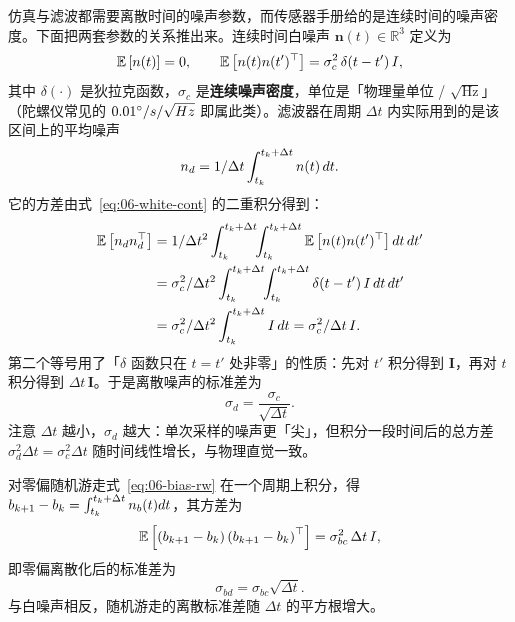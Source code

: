 仿真与滤波都需要离散时间的噪声参数，而传感器手册给的是连续时间的噪声密度。下面把两套参数的关系推出来。连续时间白噪声 $\bm{n}(t)\in\mathbb{R}^{3}$ 定义为
\begin{equation}
  \mathbb{E}\left[n(t)\right]=0,
  \qquad
  \mathbb{E}\left[n(t)n(t')^{\top}\right]=\sigma_c^{2}\,\delta(t-t')\,I,
  \label{eq:06-white-cont}
\end{equation}
其中 $\delta(\cdot)$ 是狄拉克函数，$\sigma_c$ 是\textbf{连续噪声密度}，单位是「物理量单位 / $\sqrt{\mathrm{Hz}}$」（陀螺仪常见的 $0.01^\circ/s/\sqrt{Hz}$ 即属此类）。滤波器在周期 $\Delta t$ 内实际用到的是该区间上的平均噪声
\begin{equation}
  n_d = 1/\Delta t\int_{t_k}^{t_k+\Delta t}n(t)\,d t.
\end{equation}
它的方差由式~\eqref{eq:06-white-cont} 的二重积分得到：
\begin{align}
  \mathbb{E}\left[n_dn_d^{\top}\right]
  &= 1/\Delta t^{2}\int_{t_k}^{t_k+\Delta t}\!\!\int_{t_k}^{t_k+\Delta t}
     \mathbb{E}\left[n(t)n(t')^{\top}\right]d t\,d t' \notag\\
  &= \sigma_c^{2}/\Delta t^{2}\int_{t_k}^{t_k+\Delta t}\!\!\int_{t_k}^{t_k+\Delta t}
     \delta(t-t')\,I\,d t\,d t' \notag\\
  &= \sigma_c^{2}/\Delta t^{2}\int_{t_k}^{t_k+\Delta t}I\,d t
  = \sigma_c^{2}/\Delta t\,I.
  \label{eq:06-white-disc}
\end{align}
第二个等号用了「$\delta$ 函数只在 $t=t'$ 处非零」的性质：先对 $t'$ 积分得到 $\bm{I}$，再对 $t$ 积分得到 $\Delta t\,\bm{I}$。于是离散噪声的标准差为
\begin{equation}
  \sigma_d = \frac{\sigma_c}{\sqrt{\Delta t}}.
  \label{eq:06-sigma-disc}
\end{equation}
注意 $\Delta t$ 越小，$\sigma_d$ 越大：单次采样的噪声更「尖」，但积分一段时间后的总方差 $\sigma_d^{2}\Delta t=\sigma_c^{2}\Delta t$ 随时间线性增长，与物理直觉一致。

对零偏随机游走式~\eqref{eq:06-bias-rw} 在一个周期上积分，得 $b_{k+1}-b_k=\int_{t_k}^{t_k+\Delta t}n_b(t)d t$，其方差为
\begin{equation}
  \mathbb{E}\left[\left(b_{k+1}-b_k\right)\left(b_{k+1}-b_k\right)^{\top}\right]
  = \sigma_{bc}^{2}\,\Delta t\,I,
\end{equation}
即零偏离散化后的标准差为
\begin{equation}
  \sigma_{bd} = \sigma_{bc}\sqrt{\Delta t}.
  \label{eq:06-bias-disc}
\end{equation}
与白噪声相反，随机游走的离散标准差随 $\Delta t$ 的平方根增大。


